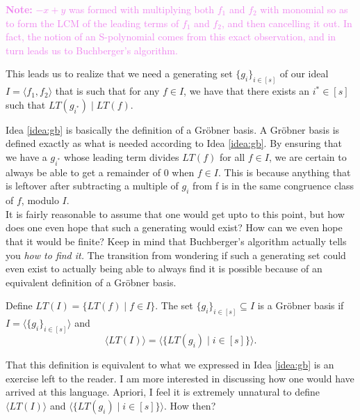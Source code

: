 \documentclass[10pt]{article}
\newcommand{\gb}{Gr\"{o}bner }
\newcommand*{\ideal}[1]{\langle#1\rangle}
\begin{document}
\begin{mdframed}
\textcolor{Violet}{\textbf{Note:} $-x + y$ was formed with multiplying both $f_1$ and $f_2$ with monomial so as to form the LCM of the leading terms of $f_1$ and $f_2$, and then cancelling it out. In fact, the notion of an S-polynomial comes from this exact observation, and in turn leads us to Buchberger's algorithm.}
\end{mdframed}

\begin{ideabox}
\label{idea:gb}
This leads us to realize that we need a generating set $\{g_i\}_{i \in [s]}$ of our ideal $I = \ideal{f_1, f_2}$ that is such that for any $f \in I$, we have that there exists an $i^* \in [s]$ such that $LT(g_{i^*}) \mid LT(f)$.
\end{ideabox}

Idea \ref{idea:gb} is basically the definition of a \gb basis. A \gb basis is defined exactly as what is needed according to Idea \ref{idea:gb}. By ensuring that we have a $g_{i^*}$ whose leading term divides $LT(f)$ for all $f \in I$, we are certain to always be able to get a remainder of $0$ when $f \in I$. This is because anything that is leftover after subtracting a multiple of $g_i$ from f is in the same congruence class of $f$, modulo $I$. \\

It is fairly reasonable to assume that one would get upto to this point, but how does one even hope that such a generating would exist? How can we even hope that it would be finite? Keep in mind that Buchberger's algorithm actually tells you \emph{how to find it.} The transition from wondering if such a generating set could even exist to actually being able to always find it is possible because of an equivalent definition of a \gb basis.

\begin{definition}
\label{def:gb-as-ideals}
Define $LT(I) = \{LT(f) \mid f \in I\}$. The set $\{g_i\}_{i \in [s]} \subseteq I$ is a \gb basis if $I = \ideal{\{g_i\}_{i \in [s]}}$ and
\[
\ideal{LT(I)} = \ideal{\{LT(g_i) \mid i \in [s]\}}.
\]
\end{definition}

That this definition is equivalent to what we expressed in Idea \ref{idea:gb} is an exercise left to the reader. I am more interested in discussing how one would have arrived at this language. Apriori, I feel it is extremely unnatural to define $\ideal{LT(I)}$ and $\ideal{\{LT(g_i) \mid i \in [s]\}}$. How then? \\
\end{document}
